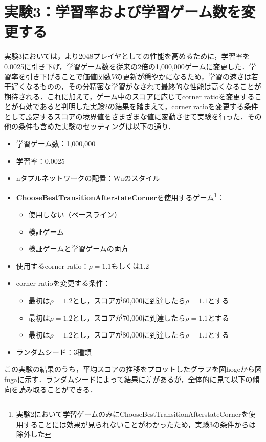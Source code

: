 \documentclass{suribt}
\begin{document}
\section{実験3：学習率および学習ゲーム数を変更する}
実験3においては，より2048プレイヤとしての性能を高めるために，学習率を0.0025に引き下げ，学習ゲーム数を従来の2倍の1,000,000ゲームに変更した．学習率を引き下げることで価値関数$V$の更新が穏やかになるため，学習の速さは若干遅くなるものの，その分精密な学習がなされて最終的な性能は高くなることが期待される．これに加えて，ゲーム中のスコアに応じてcorner ratioを変更することが有効であると判明した実験2の結果を踏まえて，corner ratioを変更する条件として設定するスコアの境界値をさまざまな値に変動させて実験を行った．その他の条件も含めた実験のセッティングは以下の通り．

\begin{itemize}
\item 学習ゲーム数：1,000,000
\item 学習率：0.0025
\item nタプルネットワークの配置：Wuのスタイル
\item \textbf{ChooseBestTransitionAfterstateCorner}を使用するゲーム\footnote{実験2において学習ゲームのみにChooseBestTransitionAfterstateCornerを使用することには効果が見られないことがわかったため，実験3の条件からは除外した}：
\begin{itemize}
\item 使用しない（ベースライン）
\item 検証ゲーム
\item 検証ゲームと学習ゲームの両方
\end{itemize}
\item 使用するcorner ratio：${\rho}=1.1 \text{もしくは} 1.2$
\item corner ratioを変更する条件：
\begin{itemize}
\item 最初は${\rho}=1.2$とし，スコアが60,000に到達したら${\rho}=1.1$とする
\item 最初は${\rho}=1.2$とし，スコアが70,000に到達したら${\rho}=1.1$とする
\item 最初は${\rho}=1.2$とし，スコアが80,000に到達したら${\rho}=1.1$とする
\end{itemize}
\item ランダムシード：3種類
\end{itemize}

この実験の結果のうち，平均スコアの推移をプロットしたグラフを図hogeから図fugaに示す．ランダムシードによって結果に差があるが，全体的に見て以下の傾向を読み取ることができる．
\end{document}
